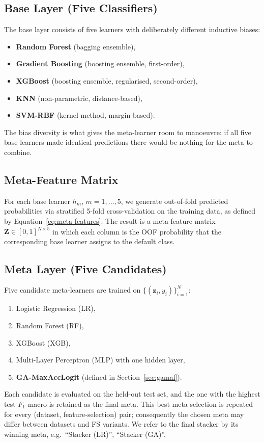 \subsection{Base Layer (Five Classifiers)}

The base layer consists of five learners with deliberately different
inductive biases:
\begin{itemize}
 \item \textbf{Random Forest} (bagging ensemble),
 \item \textbf{Gradient Boosting} (boosting ensemble, first-order),
 \item \textbf{XGBoost} (boosting ensemble, regularised, second-order),
 \item \textbf{KNN} (non-parametric, distance-based),
 \item \textbf{SVM-RBF} (kernel method, margin-based).
\end{itemize}
The bias diversity is what gives the meta-learner room to manoeuvre:
if all five base learners made identical predictions there would be
nothing for the meta to combine.

\subsection{Meta-Feature Matrix}

For each base learner $h_m$, $m=1,\ldots,5$, we generate out-of-fold
predicted probabilities via stratified 5-fold cross-validation on
the training data, as defined by Equation~\eqref{eq:meta-features}.
The result is a meta-feature matrix
$\mathbf{Z}\in[0,1]^{N\times 5}$ in which each column is the OOF
probability that the corresponding base learner assigns to the
default class.

\subsection{Meta Layer (Five Candidates)}

Five candidate meta-learners are trained on
$\{(\mathbf{z}_i,y_i)\}_{i=1}^{N}$:
\begin{enumerate}
 \item Logistic Regression (LR),
 \item Random Forest (RF),
 \item XGBoost (XGB),
 \item Multi-Layer Perceptron (MLP) with one hidden layer,
 \item \textbf{GA-MaxAccLogit} (defined in Section~\ref{sec:gamal}).
\end{enumerate}
Each candidate is evaluated on the held-out test set, and the one
with the highest test $F_1$-macro is retained as the final meta.
This best-meta selection is repeated for every (dataset,
feature-selection) pair; consequently the chosen meta may differ
between datasets and FS variants. We refer to the final stacker by
its winning meta, e.g.\ ``Stacker (LR)'', ``Stacker (GA)''.

